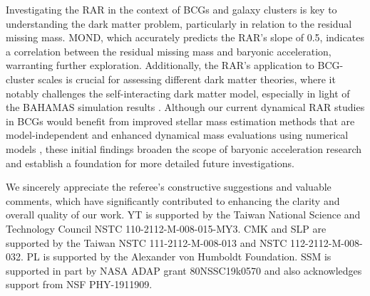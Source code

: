 \documentclass[a4paper, two-column, twocolappendix]{aa}
\begin{document}
Investigating the RAR in the context of BCGs and galaxy clusters is key to understanding the dark matter problem, particularly in relation to the residual missing mass. MOND, which accurately predicts the RAR's slope of 0.5, indicates a correlation between the residual missing mass and baryonic acceleration, warranting further exploration. Additionally, the RAR's application to BCG-cluster scales is crucial for assessing different dark matter theories, where it notably challenges the self-interacting dark matter model, especially in light of the BAHAMAS simulation results \citep{Tam23}. Although our current dynamical RAR studies in BCGs would benefit from improved stellar mass estimation methods that are model-independent and enhanced dynamical mass evaluations using numerical models \citep{li23}, these initial findings broaden the scope of baryonic acceleration research and establish a foundation for more detailed future investigations. 


\begin{acknowledgements}
We sincerely appreciate the referee's constructive suggestions and valuable comments, which have significantly contributed to enhancing the clarity and overall quality of our work.
YT is supported by the Taiwan National Science and Technology Council NSTC 110-2112-M-008-015-MY3. 
CMK and SLP are supported by the Taiwan NSTC 111-2112-M-008-013 and NSTC 112-2112-M-008-032.
PL is supported by the Alexander von Humboldt Foundation.
SSM is supported in part by NASA ADAP grant 80NSSC19k0570 and also acknowledges support from NSF PHY-1911909.
\end{acknowledgements}



\end{document}
